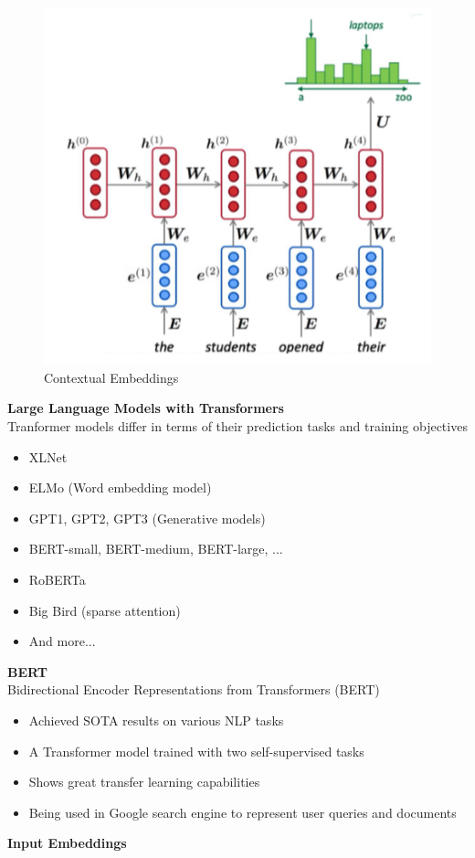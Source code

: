 \begin{figure}[h!t]
    \centering
    \includegraphics[width=0.35\linewidth]{contextualembeddings.png}
    \caption{Contextual Embeddings}
    \label{fig:enter-label}
\end{figure}

\newpage

\textbf{Large Language Models with Transformers}\\
Tranformer models differ in terms of their prediction tasks and training objectives
\begin{itemize}
    \item XLNet
    \item ELMo (Word embedding model)
    \item GPT1, GPT2, GPT3 (Generative models)
    \item BERT-small, BERT-medium, BERT-large, ...
    \item RoBERTa
    \item Big Bird (sparse attention)
    \item And more...\\
\end{itemize}

\noindent
\textbf{BERT}\\
Bidirectional Encoder Representations from Transformers (BERT)
\begin{itemize}
    \item Achieved SOTA results on various NLP tasks
    \item A Transformer model trained with two self-supervised tasks
    \item Shows great transfer learning capabilities
    \item Being used in Google search engine to represent user queries and documents\\
\end{itemize}

\noindent

\newpage

\noindent
\textbf{Input Embeddings}

